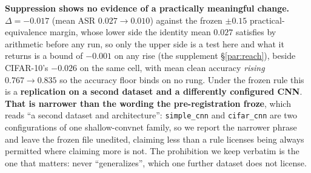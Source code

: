 \documentclass{article}
\begin{document}
\textbf{Suppression shows no evidence of a practically meaningful change.} $\Delta = -0.017$ (mean ASR $0.027 \to 0.010$) against the frozen $\pm 0.15$ practical-equivalence margin, whose lower side the identity mean $0.027$ satisfies by arithmetic before any run, so only the upper side is a test here and what it returns is a bound of $-0.001$ on any rise (the supplement §\ref{par:reach}), beside CIFAR-10's $-0.026$ on the same cell, with mean clean accuracy \emph{rising} $0.767 \to 0.835$ so the accuracy floor binds on no rung. Under the frozen rule this is a \textbf{replication on a second dataset and a differently configured CNN}. \textbf{That is narrower than the wording the pre-registration froze}, which reads ``a second dataset and architecture'': \texttt{simple\_cnn} and \texttt{cifar\_cnn} are two configurations of one shallow-convnet family, so we report the narrower phrase and leave the frozen file unedited, claiming less than a rule licenses being always permitted where claiming more is not. The prohibition we keep verbatim is the one that matters: never ``generalizes'', which one further dataset does not license.
\end{document}

